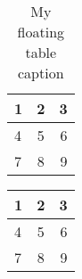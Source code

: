 \documentclass{article}
\begin{document}
\begin{table}[top]
  \centering
  \begin{tabular}{ | l || c | r | }
    \hline                       
    1 & 2 & 3 \\
    \hline                       
    \hline                       
    4 & 5 & 6 \\
    7 & 8 & 9 \\
    \hline  
  \end{tabular}
  \caption{My floating table caption}
  \label{tab:myfirsttable}
\end{table}

\begin{table}
  \begin{tabular}{ | l || c | r | }
    \hline                       
    1 & 2 & 3 \\
    \hline                       
    \hline                       
    4 & 5 & 6 \\
    7 & 8 & 9 \\
    \hline  
  \end{tabular}
\end{table}
\end{document}
